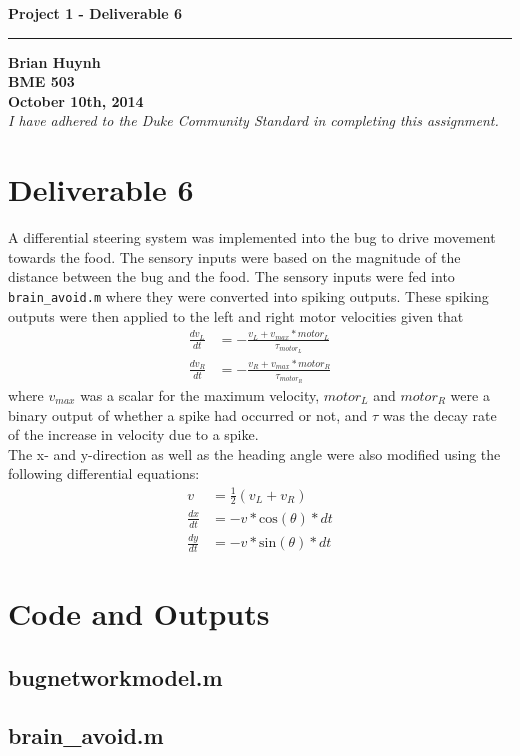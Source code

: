 \documentclass[10pt]{article}
\begin{document}
\begin{center}
\textbf{\huge Project 1 - Deliverable 6}
\rule{6.5in}{0.5mm}
\textbf{Brian Huynh \\ BME 503 \\ October 10th, 2014}\\
\emph{I have adhered to the Duke Community Standard in completing this assignment.}
\end{center}

\tableofcontents
\listoffigures
\pagebreak

\section{Deliverable 6}
A differential steering system was implemented into the bug to drive movement towards the food. The sensory inputs were based on the magnitude of the distance between the bug and the food. The sensory inputs were fed into \texttt{brain\_avoid.m} where they were converted into spiking outputs. These spiking outputs were then applied to the left and right motor velocities given that
\begin{align}
\frac{dv_L}{dt} &= -\frac{v_L + v_{max}*motor_L}{\tau_{motor_L}} \\
\frac{dv_R}{dt} &= -\frac{v_R + v_{max}*motor_R}{\tau_{motor_R}}
\end{align}
where $v_{max}$ was a scalar for the maximum velocity, $motor_L$ and $motor_R$ were a binary output of whether a spike had occurred or not, and $\tau$ was the decay rate of the increase in velocity due to a spike. \\

\noindent The x- and y-direction as well as the heading angle were also modified using the following differential equations: 
\begin{align}
v &= \frac{1}{2}(v_L + v_R) \\
\frac{dx}{dt} &= -v * \text{cos}(\theta)*dt \\
\frac{dy}{dt} &= -v * \text{sin}(\theta)*dt 
\end{align}

\pagebreak
\section{Code and Outputs}
\subsection{bugnetworkmodel.m}
\pagebreak

\subsection{brain\_avoid.m}
\pagebreak
\end{document}
